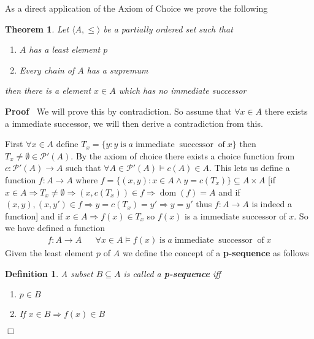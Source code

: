 \documentclass{book}
\newcommand{\tmop}[1]{\ensuremath{\operatorname{#1}}}
\newcommand{\tmtextbf}[1]{{\bfseries{#1}}}
\newenvironment{proof}{\noindent\textbf{Proof\ }}{\hspace*{\fill}$\Box$\medskip}
\newtheorem{definition}{Definition}
{\theorembodyfont{\rmfamily}\newtheorem{example}{Example}}
\newtheorem{theorem}{Theorem}
\begin{document}
{{As a direct application of the Axiom of Choice we prove the following

\begin{theorem}
  \label{application of axiom of choice}Let $\langle A, \leqslant \rangle$ be
  a partially ordered set such that
  \begin{enumerate}
    \item $A$ has a least element $p$
    
    \item Every chain of $A$ has a supremum
  \end{enumerate}
  then there is a element $x \in A$ which has no immediate successor
\end{theorem}

\begin{proof}
  We will prove this by contradiction. So assume that $\forall x \in A$ there
  exists a immediate successor, we will then derive a contradiction from this.
  
  First $\forall x \in A$ define $T_x = \{ y : y \tmop{is} a \tmop{immediate}
  \tmop{successor} \tmop{of} x \}$ then $T_x \neq \emptyset \in \mathcal{P}'
  (A)$. By the axiom of choice there exists a choice function from $c :
  \mathcal{P}' (A) \rightarrow A$ such that $\forall A \in \mathcal{P}' (A)
  \vDash c (A) \in A$. This lets us define a function $f : A \rightarrow A$
  where $f = \{ (x, y) : x \in A \wedge y = c (T_x) \} \subseteq A \times A$
  [if $x \in A \Rightarrow T_x \neq \emptyset \Rightarrow (x, c (T_x)) \in f
  \Rightarrow \tmop{dom} (f) = A$ and if $(x, y), (x, y') \in f \Rightarrow y
  = c (T_x) = y' \Rightarrow y = y'$ thus $f : A \rightarrow A$ is indeed a
  function] and if $x \in A \Rightarrow f (x) \in T_x$ so $f (x)$ is a
  immediate successor of $x$. So we have defined a function
  \begin{eqnarray*}
    f : A \rightarrow A &  & \forall x \in A \vDash f (x) \tmop{is} a
    \tmop{immediate} \tmop{successor} \tmop{of} x
  \end{eqnarray*}
  Given the least element $p$ of $A$ we define the concept of a
  \tmtextbf{p-sequence} as follows
  
  \begin{definition}
    A subset $B \subseteq A$ is called a \tmtextbf{p-sequence} iff
    \begin{enumerate}
      \item $p \in B$
      
      \item If $x \in B \Rightarrow f (x) \in B$
      

\end{enumerate}
\end{definition}
\end{proof}}}
\end{document}
